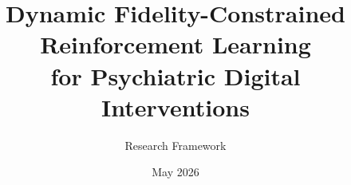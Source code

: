 \documentclass[11pt,a4paper]{article}
\title{Dynamic Fidelity-Constrained Reinforcement Learning \\ for Psychiatric Digital Interventions}
\author{Research Framework}
\date{May 2026}
\begin{document}
\maketitle

\begin{abstract}

\end{abstract}






\newpage

\end{document}

